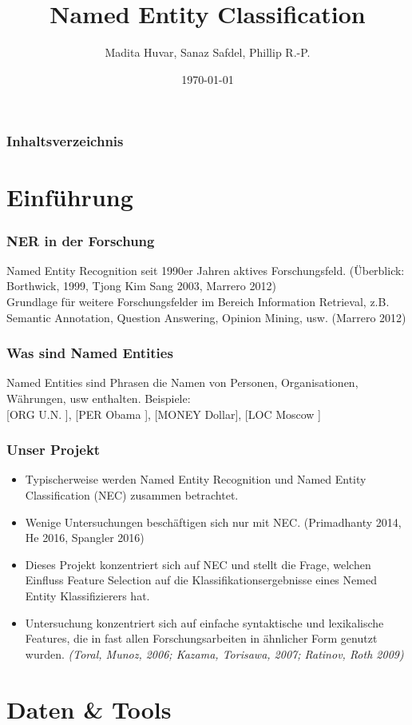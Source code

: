 \documentclass{beamer}
\title{Named Entity Classification}
\author{Madita Huvar, Sanaz Safdel, Phillip R.-P.}
\date{\today}
\begin{document}
\begin{frame}
\titlepage
\end{frame} 

\begin{frame}
\frametitle{Inhaltsverzeichnis}
\tableofcontents
\end{frame} 


\section{Einführung}
\begin{frame}
	\frametitle{NER in der Forschung}
	Named Entity Recognition seit 1990er Jahren aktives Forschungsfeld. (Überblick: Borthwick, 1999, Tjong Kim Sang 2003, Marrero 2012)\\
	
	Grundlage für weitere Forschungsfelder im Bereich Information Retrieval, z.B. Semantic Annotation, Question Answering, Opinion Mining, usw. (Marrero 2012)
\end{frame}
\begin{frame}
	\frametitle{Was sind Named Entities}
	Named Entities sind Phrasen die Namen von Personen, Organisationen, Währungen, usw enthalten. Beispiele:\\
	
	[ORG U.N. ], [PER Obama ], [MONEY Dollar], [LOC Moscow ] 
\end{frame}
	\begin{frame}
		\frametitle{Unser Projekt}
		\begin{itemize}
			\item Typischerweise werden Named Entity Recognition und Named Entity Classification (NEC) zusammen betrachtet.
			\item Wenige Untersuchungen beschäftigen sich nur mit NEC. (Primadhanty 2014, He 2016, Spangler 2016)
			\item Dieses Projekt konzentriert sich auf NEC und stellt die Frage, welchen Einfluss Feature Selection auf die Klassifikationsergebnisse eines Nemed Entity Klassifizierers hat.
			\item 		Untersuchung konzentriert sich auf einfache syntaktische und lexikalische Features, die in fast allen Forschungsarbeiten in ähnlicher Form genutzt wurden. \textit{(Toral, Munoz, 2006; Kazama, Torisawa, 2007; Ratinov, Roth 2009)} 
		\end{itemize}	

	\end{frame}
\section{Daten \& Tools}
\end{document}
